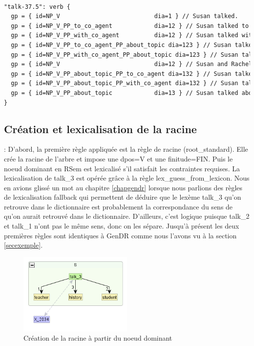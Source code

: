 \begin{lstlisting}[language=XML, caption=Input textuel de l'exemple]

"talk-37.5": verb {
  gp = { id=NP_V                           dia=1 } // Susan talked.
  gp = { id=NP_V_PP_to_co_agent            dia=12 } // Susan talked to Rachel.
  gp = { id=NP_V_PP_with_co_agent          dia=12 } // Susan talked with Rachel.
  gp = { id=NP_V_PP_to_co_agent_PP_about_topic dia=123 } // Susan talked to Rachel about the problem.
  gp = { id=NP_V_PP_with_co_agent_PP_about_topic dia=123 } // Susan talked with Rachel about the problem.
  gp = { id=NP_V                           dia=12 } // Susan and Rachel talked.
  gp = { id=NP_V_PP_about_topic_PP_to_co_agent dia=132 } // Susan talked about the problem to Rachel.
  gp = { id=NP_V_PP_about_topic_PP_with_co_agent dia=132 } // Susan talked about the problem with Rachel.
  gp = { id=NP_V_PP_about_topic            dia=13 } // Susan talked about the problems of modern America.
}
\end{lstlisting}

\subsection{Création et lexicalisation de la racine}:
D'abord, la première règle appliquée est la règle de racine (root\_standard). Elle crée la racine de l'arbre et impose une dpos=V et une finitude=FIN. Puis le noeud dominant en RSem est lexicalisé s'il satisfait les contraintes requises. La lexicalisation de talk\_3 est opérée grâce à la règle lex\_guess\_from\_lexicon. Nous en avions glissé un mot au chapitre \ref{chapgendr} lorsque nous parlions des règles de lexicalisation fallback qui permettent de déduire que le lexème talk\_3 qu'on retrouve dans le dictionnaire est probablement la correspondance du sens de  qu'on aurait retrouvé dans le dictionnaire. D'ailleurs, c'est logique puisque talk\_2 et talk\_1 n'ont pas le même sens, donc on les sépare. Jusqu'à présent les deux premières règles sont identiques à GenDR comme nous l'avons vu à la section \ref{secexemple}.

\begin{figure}[htb]
	\centering
	\includegraphics[width=0.5\textwidth, trim = {0cm 0cm 0cm 0cm},clip]{ch6/figs/root.png}
	\caption{Création de la racine à partir du noeud dominant}
	\label{deroulement0}
\end{figure}


